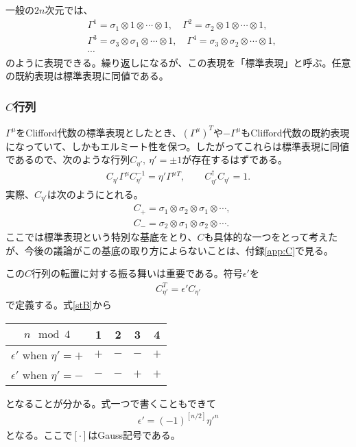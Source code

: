 \documentclass[12pt,a4paper,dvipdfmx]{jlreq}
\begin{document}
一般の$2n$次元では、
\begin{align}
  &\Gamma^{1}=\sigma_1\otimes 1 \otimes \cdots \otimes 1,\quad
  \Gamma^{2}=\sigma_2\otimes 1 \otimes \cdots \otimes 1,\nonumber\\
  &\Gamma^{3}=\sigma_3\otimes\sigma_1\otimes \cdots \otimes 1,\quad
  \Gamma^{4}=\sigma_3\otimes\sigma_2 \otimes \cdots \otimes 1,\nonumber\\
  &\cdots
  \label{stdrep}
\end{align}
のように表現できる。繰り返しになるが、この表現を「標準表現」と呼ぶ。任意の既約表現は標準表現に同値である。

\subsubsection{$C$行列}
$\Gamma^{\mu}$をClifford代数の標準表現としたとき、$(\Gamma^{\mu})^{T}$や$-\Gamma^{\mu}$もClifford代数の既約表現になっていて、しかもエルミート性を保つ。したがってこれらは標準表現に同値であるので、次のような行列$C_{\eta'},\ \eta'=\pm 1$が存在するはずである。
\begin{align}
  C_{\eta'}\Gamma^{\mu}C_{\eta'}^{-1}=\eta' \Gamma^{\mu}{}^{T},\qquad C_{\eta'}^{\dag}C_{\eta'}=1.
  \label{C}
\end{align}
実際、$C_{\eta'}$は次のようにとれる。
\begin{align}
  &C_{+}=\sigma_1\otimes \sigma_2\otimes \sigma_1\otimes \cdots,\\
  &C_{-}=\sigma_2\otimes \sigma_1\otimes \sigma_2\otimes \cdots.
  \label{stB}
\end{align}
ここでは標準表現という特別な基底をとり、$C$も具体的な一つをとって考えたが、今後の議論がこの基底の取り方によらないことは、付録\ref{app:C}で見る。

この$C$行列の転置に対する振る舞いは重要である。符号$\epsilon'$を
\begin{align}
  C_{\eta'}^{T}=\epsilon' C_{\eta'}
\end{align}
で定義する。式\eqref{stB}から
\begin{center}
  \begin{tabular}{|c|c|c|c|c|}\hline
    $n \mod 4$           & 1 & 2 & 3 & 4\\ \hline\hline
    $\epsilon'$ when $\eta'=+$ & $+$ & $-$ & $-$ & $+$\\ \hline
    $\epsilon'$ when $\eta'=-$ & $-$ & $-$ & $+$ & $+$\\ \hline
  \end{tabular}
\end{center}
となることが分かる。式一つで書くこともできて
\begin{align*}
  \epsilon'=(-1)^{[n/2]}\eta'^n
\end{align*}
となる。ここで$[\cdot]$はGauss記号である。
\end{document}
